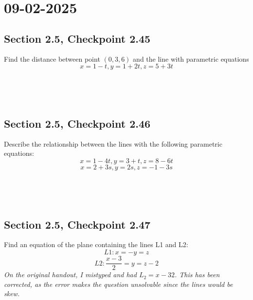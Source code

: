 \documentclass[]{mangos-musings}
\begin{document}
\newpage
\section{09-02-2025}
\subsection{Section 2.5, Checkpoint 2.45}
Find the distance between point $(0,3,6)$ and the line with parametric equations 
\[x=1-t,y=1+2t,z=5+3t\]
\begin{align*}
  \\ 
  \\ 
  \\ 
  \\
  \\
  \\
  \\
  \\
  \\
  \\
\end{align*}


\subsection{Section 2.5, Checkpoint 2.46}
Describe the relationship between the lines with the following parametric equations:
\[x=1-4t,y=3+t,z=8-6t\]
\[x=2+3s,y=2s,z=-1-3s\]
\begin{align*}
  \\ 
  \\ 
  \\
  \\
  \\
  \\
  \\ 
  \\
  \\
  \\
\end{align*}

\subsection{Section 2.5, Checkpoint 2.47}
Find an equation of the plane containing the lines L1 and L2:
\[L1:x=-y=z\]
\[L2:\frac{x-3}{2}=y=z-2\]
\textit{On the original handout, I mistyped and had $L_2 = x - 32$. This has been corrected, as the error makes the question unsolvable since the lines would be skew.}
\begin{align*}
  \\ \\ \\ \\ \\ \\ \\ \\
\end{align*}
\end{document}
